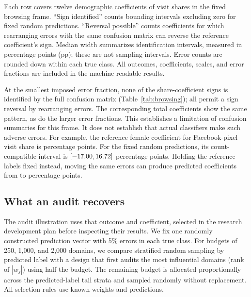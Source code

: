 \begin{table}[htbp]
\centering\small
\caption{What exact confusion counts establish at 1\% imposed error in each true class}
\label{tab:browsing}

\par\smallskip
\begin{minipage}{\linewidth}\footnotesize
Each row covers twelve demographic coefficients of visit shares in the fixed
browsing frame. ``Sign identified'' counts bounding intervals excluding zero
for fixed random predictions. ``Reversal possible'' counts coefficients for
which rearranging errors with the same confusion matrix can reverse the
reference coefficient's sign. Median width summarizes identification intervals,
measured in percentage points (pp); these are not sampling intervals. Error
counts are rounded down within each true class. All outcomes, coefficients,
scales, and error fractions are included in the machine-readable results.
\end{minipage}
\end{table}

At the smallest imposed error fraction, none of the \BenchmarkContrasts{}
share-coefficient signs is identified by the full confusion matrix
(Table~\ref{tab:browsing}); all permit a sign reversal by rearranging errors.
The corresponding total coefficients show the same pattern, as do the larger
error fractions. This establishes a limitation of confusion summaries for
this frame. It does not establish that actual classifiers make such adverse
errors. For example, the reference female coefficient for Facebook-pixel visit
share is \FocalTruth{} percentage points. For the fixed random predictions,
its count-compatible interval is $[-17.00{},16.72{}]$ percentage
points. Holding the reference labels fixed instead, moving the same errors
can produce predicted coefficients from \FocalAdverseLower{} to
\FocalAdverseUpper{} percentage points.

\subsection{What an audit recovers}
The audit illustration uses that outcome and coefficient, selected in the
research development plan before inspecting their results. We fix one randomly
constructed prediction vector with 5\% errors in each true class. For budgets
of 250, 1,000, and 2,000 domains, we compare stratified random sampling by
predicted label with a design that first audits the most influential domains
(rank of $|w_j|$) using half the budget. The remaining budget is allocated
proportionally across the predicted-label tail strata and sampled randomly
without replacement. All selection rules use known weights and predictions.


